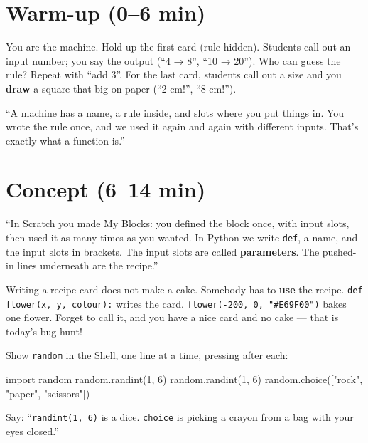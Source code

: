 \section{Warm-up (0--6 min)}
\begin{unplugged}
You are the machine. Hold up the first card (rule hidden). Students call out an input number; you say the output (\enquote{4 → 8}, \enquote{10 → 20}). Who can guess the rule? Repeat with \enquote{add 3}. For the last card, students call out a size and you \textbf{draw} a square that big on paper (\enquote{2 cm!}, \enquote{8 cm!}).
\end{unplugged}
\begin{teacherscript}
\enquote{A machine has a name, a rule inside, and slots where you put things in. You wrote the rule once, and we used it again and again with different inputs. That's exactly what a function is.}
\end{teacherscript}

\section{Concept (6--14 min)}
\begin{teacherscript}
\enquote{In Scratch you made My Blocks: you defined the block once, with input slots, then used it as many times as you wanted. In Python we write \texttt{def}, a name, and the input slots in brackets. The input slots are called \textbf{parameters}. The pushed-in lines underneath are the recipe.}
\end{teacherscript}
\begin{analogy}
Writing a recipe card does not make a cake. Somebody has to \textbf{use} the recipe. \texttt{def flower(x, y, colour):} writes the card. \texttt{flower(-200, 0, "\#E69F00")} bakes one flower. Forget to call it, and you have a nice card and no cake --- that is today's bug hunt!
\end{analogy}
Show \texttt{random} in the Shell, one line at a time, pressing  after each:
\begin{pycode}
import random
random.randint(1, 6)
random.randint(1, 6)
random.choice(["rock", "paper", "scissors"])
\end{pycode}
Say: \enquote{\texttt{randint(1, 6)} is a dice. \texttt{choice} is picking a crayon from a bag with your eyes closed.}

